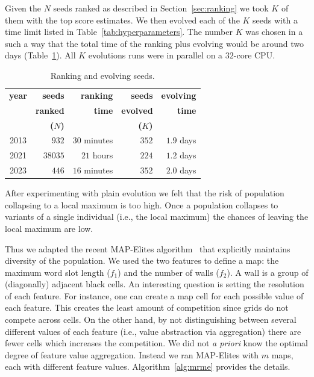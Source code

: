 Given the $N$ seeds ranked as described in Section~\ref{sec:ranking} we took $K$ of them with the top score estimates. We then evolved each of the $K$ seeds with a time limit listed in Table~\ref{tab:hyperparameters}. The number $K$ was chosen in a such a way that the total time of the ranking plus evolving would be around two days (Table~\ref{tab:rankingEvolving}). All $K$ evolutions runs were in parallel on a $32$-core CPU.

\begin{table}[htbp]
\caption{Ranking and evolving seeds.}
\label{tab:rankingEvolving}
{
\centering
\begin{tabular}{c|r|r|r|r}
\toprule
{\bf year} & {\bf seeds} & {\bf ranking} & {\bf seeds} & {\bf evolving}\\
           & {\bf ranked} & {\bf time} & {\bf evolved} & {\bf time} \\
           & {\bf ($N$)} & & {\bf ($K$)} & \\
\midrule
2013 & $932$ & $30$ minutes & $352$ & $1.9$ days \\ 
2021 & $38035$ & $21$ hours & $224$ & $1.2$ days \\ 
2023 & $446$ & $16$ minutes & $352$ & $2.0$ days \\ 
\bottomrule
\end{tabular}
}
\end{table}

After experimenting with plain evolution we felt that the risk of population collapsing to a local maximum is too high. Once a population collapses to variants of a single individual (i.e., the local maximum) the chances of leaving the local maximum are low. 

Thus we adapted the recent MAP-Elites algorithm~\cite{mapElites} that explicitly maintains diversity of the population. We used the two features to define a map: the maximum word slot length ($f_1$) and the number of walls ($f_2$). A wall is a group of (diagonally) adjacent black cells. An interesting question is setting the resolution of each feature. For instance, one can create a map cell for each possible value of each feature. This creates the least amount of competition since grids do not compete across cells. On the other hand, by not distinguishing between several different values of each feature (i.e., value abstraction via aggregation) there are fewer cells which increases the competition. We did not {\em a priori} know the optimal degree of feature value aggregation. Instead we ran MAP-Elites with $m$ maps, each with different feature values. Algorithm~\ref{alg:mrme} provides the details. 


